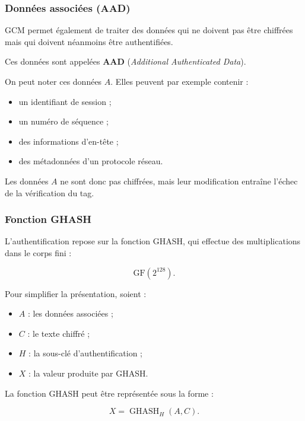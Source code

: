 \documentclass[12pt,a4paper]{article}
\begin{document}
\subsubsection{Données associées (AAD)}

GCM permet également de traiter des données qui ne doivent pas être
chiffrées mais qui doivent néanmoins être authentifiées.

Ces données sont appelées \textbf{AAD}
(\textit{Additional Authenticated Data}).

On peut noter ces données $A$. Elles peuvent par exemple contenir :

\begin{itemize}
    \item un identifiant de session ;
    \item un numéro de séquence ;
    \item des informations d'en-tête ;
    \item des métadonnées d'un protocole réseau.
\end{itemize}

Les données $A$ ne sont donc pas chiffrées, mais leur modification
entraîne l'échec de la vérification du tag.

\subsubsection{Fonction GHASH}

L'authentification repose sur la fonction GHASH, qui effectue des
multiplications dans le corps fini :

\begin{equation}
\mathrm{GF}(2^{128}).
\end{equation}

Pour simplifier la présentation, soient :

\begin{itemize}
    \item $A$ : les données associées ;
    \item $C$ : le texte chiffré ;
    \item $H$ : la sous-clé d'authentification ;
    \item $X$ : la valeur produite par GHASH.
\end{itemize}

La fonction GHASH peut être représentée sous la forme :

\begin{equation}
X = \operatorname{GHASH}_H(A,C).
\label{eq:ghash_general}
\end{equation}
\end{document}
